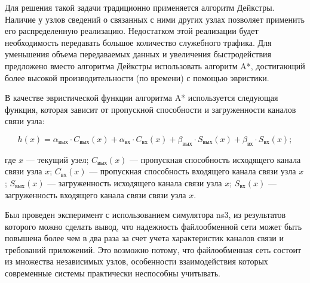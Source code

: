 \documentclass[10pt, a5paper]{article}
\begin{document}
Для решения такой задачи традиционно применяется алгоритм Дейкстры. Наличие у узлов сведений о связанных с ними других узлах позволяет применить его распределенную реализацию. Недостатком этой реализации будет необходимость передавать большое количество служебного трафика. Для уменьшения объема передаваемых данных и увеличения быстродействия предложено вместо алгоритма Дейкстры использовать алгоритм A*, достигающий более высокой производительности (по времени) с помощью эвристики.

В качестве эвристической функции алгоритма A* используется следующая функция, которая зависит от пропускной способности и загруженности каналов связи узла:

$$ h(x) = \alpha_{\text{вых}} \cdot C_{\text{вых}}(x) + \alpha_{\text{вх}} \cdot C_{\text{вх}}(x) + \beta_{\text{вых}} \cdot S_{\text{вых}}(x)+ \beta_{\text{вх}} \cdot S_{\text{вх}}(x); $$

\noindent где $x$ --- текущий узел;
$C_{\text{вых}}(x)$ --- пропускная способность  исходящего  канала связи  узла $x$;
$C_{\text{вх}}(x)$ --- пропускная способность   входящего  канала связи  узла $x$;
$S_{\text{вых}}(x)$ --- загруженность исходящего  канала связи  узла $x$;
$S_{\text{вх}}(x)$ --- загруженность входящего  канала связи  связи  узла $x$.

Был проведен эксперимент с использованием симулятора ns3, из результатов которого можно сделать вывод, что надежность файлообменной сети может быть повышена более чем в два раза за счет учета характеристик каналов связи и требований приложений. Это возможно потому, что файлообменная сеть состоит из множества независимых узлов, особенности взаимодействия которых современные системы практически неспособны учитывать. 
\end{document}

